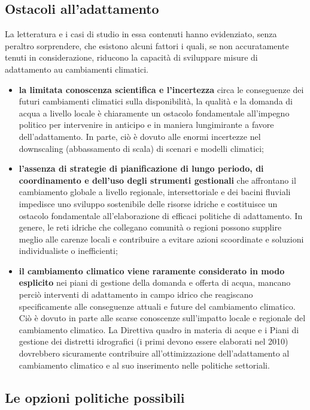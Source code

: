 \documentclass[14pt,a4paper]{article}
\begin{document}
	\subsection{Ostacoli all'adattamento}
		La letteratura e i casi di studio in essa contenuti hanno evidenziato, senza peraltro sorprendere, che esistono alcuni fattori i quali, se non accuratamente tenuti in considerazione, riducono la capacità di sviluppare misure di adattamento au cambiamenti climatici.
		
		\begin{itemize}
		\item \textbf{la limitata conoscenza scientifica e l'incertezza} circa le conseguenze dei futuri cambiamenti climatici sulla disponibilità, la qualità e la domanda di acqua a livello locale è chiaramente un ostacolo fondamentale all'impegno politico per intervenire in anticipo e in maniera lungimirante a favore dell'adattamento. In parte, ciò è dovuto alle enormi incertezze nel downscaling (abbassamento di scala) di scenari e modelli climatici;
		\item \textbf{l'assenza di strategie di pianificazione di lungo periodo, di coordinamento e dell'uso degli strumenti gestionali} che affrontano il cambiamento globale a livello regionale, intersettoriale e dei bacini fluviali impedisce
		uno sviluppo sostenibile delle risorse idriche e costituisce un ostacolo fondamentale all'elaborazione di efficaci politiche di adattamento. In genere, le reti idriche che  collegano comunità o regioni possono supplire meglio alle carenze locali e contribuire a evitare azioni scoordinate e soluzioni individualiste o inefficienti;
		\item \textbf{il cambiamento climatico viene raramente considerato in modo esplicito }nei piani di gestione della domanda e offerta di acqua, mancano perciò interventi di adattamento in
		campo idrico che reagiscano specificamente alle	conseguenze attuali e future del cambiamento climatico. Ciò è dovuto in parte alle scarse conoscenze sull'impatto locale e regionale del cambiamento climatico. La Direttiva quadro in materia di acque e i Piani di gestione dei distretti idrografici (i primi devono essere	elaborati nel 2010) dovrebbero sicuramente contribuire all'ottimizzazione dell'adattamento
		al cambiamento climatico e al suo inserimento nelle politiche settoriali.
		\end{itemize}
		
		\subsection{Le opzioni politiche possibili}
		
\end{document}
